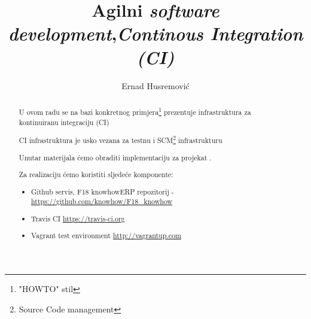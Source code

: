 \documentclass[times, utf8, seminar]{fit}
\begin{document}


\title{Agilni \emph{software development},\newline \emph{Continous Integration (CI)}}

\author{Ernad Husremović}


\maketitle

\tableofcontents

\newpage

\begin{abstract}

U ovom radu se na bazi konkretnog primjera\footnote{"HOWTO" stil} prezentuje infrastruktura za kontinuiranu integraciju (CI) 

CI infrastruktura je usko vezana za testnu i SCM\footnote{Source Code management} infrastrukturu\citep{agilegit}

Unutar materijala ćemo obraditi implementaciju \href{http://travis-ci.org}{\color{blue}{''Travis Continous Integration''}} za projekat \href{http://redmine.bring.out.ba/projects/knowhow}{\color{blue}{''F18 knowhow''}}.

Za realizaciju ćemo koristiti sljedeće komponente:
\begin{itemize}
  \item Github servis, F18 knowhowERP repozitorij - \url{https://github.com/knowhow/F18\_knowhow}
  \item Travis CI  \url{https://travis-ci.org}
  \item Vagrant test environment  \url{http://vagrantup.com}
\end{itemize}

\end{abstract}

\end{document}
